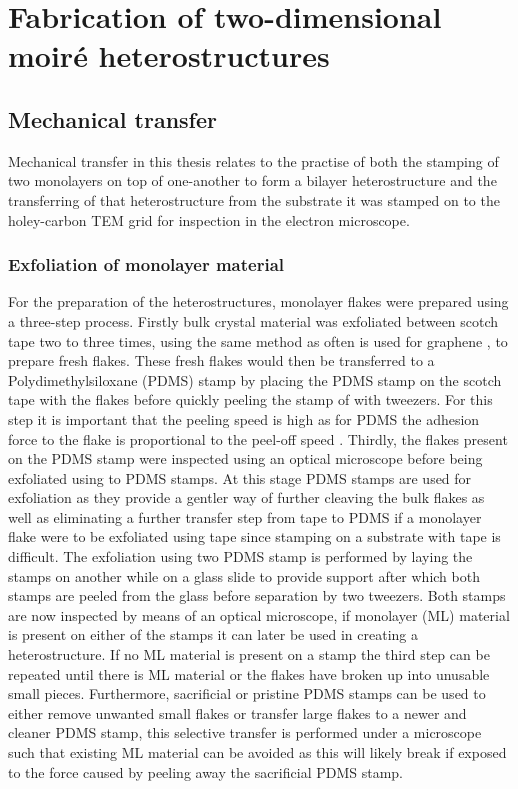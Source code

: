 \section{Fabrication of two-dimensional moiré heterostructures}
\subsection{Mechanical transfer}
Mechanical transfer in this thesis relates to the practise of both the stamping of two monolayers on top of one-another to form a bilayer heterostructure and the transferring of that heterostructure from the substrate it was stamped on to the holey-carbon TEM grid for inspection in the electron microscope.

\subsubsection{Exfoliation of monolayer material}
For the preparation of the heterostructures, monolayer flakes were prepared using a three-step process.
Firstly bulk crystal material was exfoliated between scotch tape two to three times, using the same method as often is used for graphene \cite{novoselovRoomTemperatureQuantumHall2007}, to prepare fresh flakes.
These fresh flakes would then be transferred to a Polydimethylsiloxane (PDMS) stamp by placing the PDMS stamp on the scotch tape with the flakes before quickly peeling the stamp of with tweezers. For this step it is important that the peeling speed is high as for PDMS the adhesion force to the flake is proportional to the peel-off speed \cite{kusakaMicrocontactPatterningConductive2015}.
Thirdly, the flakes present on the PDMS stamp were inspected using an optical microscope before being exfoliated using to PDMS stamps. At this stage PDMS stamps are used for exfoliation as they provide a gentler way of further cleaving the bulk flakes as well as eliminating a further transfer step from tape to PDMS if a monolayer flake were to be exfoliated using tape since stamping on a substrate with tape is difficult. The exfoliation using two PDMS stamp is performed by laying the stamps on another while on a glass slide to provide support after which both stamps are peeled from the glass before separation by two tweezers. Both stamps are now inspected by means of an optical microscope, if monolayer (ML) material is present on either of the stamps it can later be used in creating a heterostructure.
If no ML material is present on a stamp the third step can be repeated until there is ML material or the flakes have broken up into unusable small pieces.
Furthermore, sacrificial or pristine PDMS stamps can be used to either remove unwanted small flakes or transfer large flakes to a newer and cleaner PDMS stamp, this selective transfer is performed under a microscope such that existing ML material can be avoided as this will likely break if exposed to the force caused by peeling away the sacrificial PDMS stamp.

